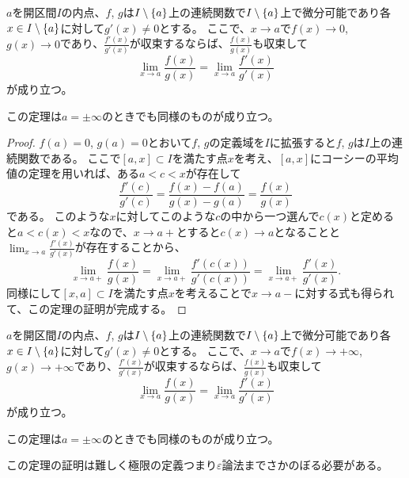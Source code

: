 \begin{theorem}[ロピタルの定理１]
$a$を開区間$I$の内点、$f$, $g$は$I\setminus\{a\}$上の連続関数で$I\setminus\{a\}$上で微分可能であり各$x \in I\setminus\{a\}$に対して$g'(x) \ne 0$とする。
ここで、$x \to a$で$f(x) \to 0$, $g(x) \to 0$であり、$\frac{f'(x)}{g'(x)}$が収束するならば、$\frac{f(x)}{g(x)}$も収束して
$$
\lim_{x \to a}\frac{f(x)}{g(x)} = \lim_{x \to a}\frac{f'(x)}{g'(x)}
$$
が成り立つ。
\end{theorem}

\begin{remark}
この定理は$a = \pm \infty$のときでも同様のものが成り立つ。
\end{remark}

\begin{proof}
$f(a) = 0$, $g(a) = 0$とおいて$f$, $g$の定義域を$I$に拡張すると$f$, $g$は$I$上の連続関数である。
ここで$[a, x] \subset I$を満たす点$x$を考え、$[a, x]$にコーシーの平均値の定理を用いれば、ある$a < c < x$が存在して
$$
\frac{f'(c)}{g'(c)} = \frac{f(x)-f(a)}{g(x)-g(a)} = \frac{f(x)}{g(x)}
$$
である。
このような$x$に対してこのような$c$の中から一つ選んで$c(x)$と定めると$a < c(x) < x$なので、$x \to a+$とすると$c(x) \to a$となることと$\lim_{x \to a}\frac{f'(x)}{g'(x)}$が存在することから、
$$
\lim_{x \to a+}\frac{f(x)}{g(x)} = \lim_{x \to a+}\frac{f'(c(x))}{g'(c(x))} = \lim_{x \to a+}\frac{f'(x)}{g'(x)}.
$$
同様にして$[x, a] \subset I$を満たす点$x$を考えることで$x \to a-$に対する式も得られて、この定理の証明が完成する。
\end{proof}

\begin{theorem}[ロピタルの定理２]
$a$を開区間$I$の内点、$f$, $g$は$I\setminus\{a\}$上の連続関数で$I\setminus\{a\}$上で微分可能であり各$x \in I\setminus\{a\}$に対して$g'(x) \ne 0$とする。
ここで、$x \to a$で$f(x) \to +\infty$, $g(x) \to +\infty$であり、$\frac{f'(x)}{g'(x)}$が収束するならば、$\frac{f(x)}{g(x)}$も収束して
$$
\lim_{x \to a}\frac{f(x)}{g(x)} = \lim_{x \to a}\frac{f'(x)}{g'(x)}
$$
が成り立つ。
\end{theorem}

\begin{remark}
この定理は$a = \pm \infty$のときでも同様のものが成り立つ。
\end{remark}

この定理の証明は難しく極限の定義つまり$\varepsilon$論法までさかのぼる必要がある。

